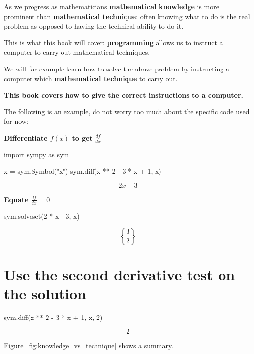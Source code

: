 As we progress as mathematicians \textbf{mathematical knowledge} is more prominent
than \textbf{mathematical technique}: often knowing what to do is the real problem as
opposed to having the technical ability to do it.

This is what this book will cover: \textbf{programming} allows us to instruct a
computer to carry out mathematical techniques.

We will for example learn how to solve the above problem by instructing a
computer which \textbf{mathematical technique} to carry out.

\textbf{This book covers how to give the correct instructions to a
computer.}

The following is an example, do not worry too much about the specific code used
for now:


\textbf{Differentiate \(f(x)\) to get \(\frac{df}{dx}\)}

\begin{pyin}
import sympy as sym

x = sym.Symbol("x")
sym.diff(x ** 2 - 3 * x + 1, x)
\end{pyin}

\[
    2x - 3
\]

\textbf{Equate \(\frac{df}{dx}=0\)}

\begin{pyin}
sym.solveset(2 * x - 3, x)
\end{pyin}

\[
\left\{\frac{3}{2}\right\}
\]

\section{Use the second derivative test on the solution}

\begin{pyin}
sym.diff(x ** 2 - 3 * x + 1, x, 2)
\end{pyin}

\[2\]

Figure~\ref{fig:knowledge_vs_technique} shows a summary.

